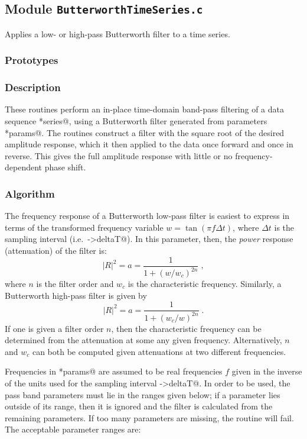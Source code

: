
\subsection{Module \texttt{ButterworthTimeSeries.c}}

Applies a low- or high-pass Butterworth filter to a time series.

\subsubsection{Prototypes}
\vspace{0.1in}


\subsubsection{Description}

These routines perform an in-place time-domain band-pass filtering of
a data sequence \verb@*series@, using a Butterworth filter generated
from parameters \verb@*params@.  The routines construct a filter with
the square root of the desired amplitude response, which it then
applied to the data once forward and once in reverse.  This gives the
full amplitude response with little or no frequency-dependent phase
shift.

\subsubsection{Algorithm}

The frequency response of a Butterworth low-pass filter is easiest to
express in terms of the transformed frequency variable $w=\tan(\pi
f\Delta t)$, where $\Delta t$ is the sampling interval (i.e.\
\verb@series->deltaT@).  In this parameter, then, the \emph{power}
response (attenuation) of the filter is:
$$
|R|^2 = a = \frac{1}{1+(w/w_c)^{2n}} \; ,
$$
where $n$ is the filter order and $w_c$ is the characteristic
frequency.  Similarly, a Butterworth high-pass filter is given by
$$
|R|^2 = a = \frac{1}{1+(w_c/w)^{2n}} \; .
$$
If one is given a filter order $n$, then the characteristic frequency
can be determined from the attenuation at some any given frequency.
Alternatively, $n$ and $w_c$ can both be computed given attenuations
at two different frequencies.

Frequencies in \verb@*params@ are assumed to be real frequencies $f$
given in the inverse of the units used for the sampling interval
\verb@series->deltaT@.  In order to be used, the pass band parameters
must lie in the ranges given below; if a parameter lies outside of its
range, then it is ignored and the filter is calculated from the
remaining parameters.  If too many parameters are missing, the routine
will fail.  The acceptable parameter ranges are:

